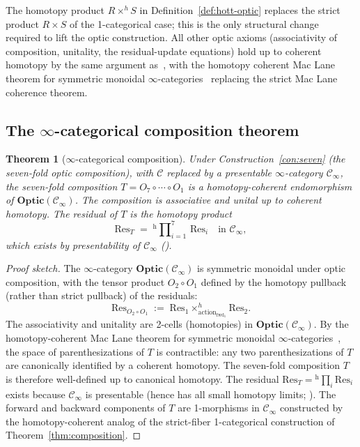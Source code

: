 \documentclass[11pt,a4paper]{article}
\theoremstyle{plain}
\newtheorem{theorem}{Theorem}[section]
\theoremstyle{definition}
\theoremstyle{remark}
\newcommand{\Optic}{\mathbf{Optic}}
\begin{document}
The homotopy product $R \times^h S$ in
Definition~\ref{def:hott-optic} replaces the strict product $R \times S$
of the 1-categorical case; this is the only structural change required
to lift the optic construction. All other optic axioms (associativity of
composition, unitality, the residual-update equations) hold up to
coherent homotopy by the same argument as~\cite[Proposition~2.3]
{riley2018optics}, with the homotopy coherent Mac Lane theorem for
symmetric monoidal $\infty$-categories~\cite[Theorem~2.4.3]
{lurie2017ha} replacing the strict Mac Lane coherence theorem.

\subsection{The $\infty$-categorical composition theorem}

\begin{theorem}[$\infty$-categorical composition]
\label{thm:hott-composition}
Under Construction~\ref{con:seven} (the seven-fold optic composition),
with $\mathcal{C}$ replaced by a presentable $\infty$-category
$\mathcal{C}_\infty$, the seven-fold composition $T = O_7 \circ \cdots
\circ O_1$ is a homotopy-coherent endomorphism of
$\Optic(\mathcal{C}_\infty)$. The composition is associative and
unital up to coherent homotopy. The residual of $T$ is the homotopy
product
\[
\mathrm{Res}_T \;=\; {}^{\mathrm{h}}\!\prod\nolimits_{i=1}^{7}\,\mathrm{Res}_i
\quad \text{in } \mathcal{C}_\infty,
\]
which exists by presentability of $\mathcal{C}_\infty$
(\cite[Proposition~5.5.3.1]{lurie2009htt}).
\end{theorem}

\begin{proof}[Proof sketch]
The $\infty$-category $\Optic(\mathcal{C}_\infty)$ is symmetric
monoidal under optic composition, with the tensor product $O_2 \circ
O_1$ defined by the homotopy pullback (rather than strict pullback) of
the residuals:
\[
\mathrm{Res}_{O_2 \circ O_1} \;:=\;
\mathrm{Res}_1 \times^h_{\mathrm{action}_{\mathrm{fwd}_1}} \mathrm{Res}_2.
\]
The associativity and unitality are 2-cells (homotopies) in
$\Optic(\mathcal{C}_\infty)$. By the homotopy-coherent Mac Lane theorem
for symmetric monoidal $\infty$-categories~\cite[Theorem~2.4.3]
{lurie2017ha}, the space of parenthesizations of $T$ is contractible:
any two parenthesizations of $T$ are canonically identified by a
coherent homotopy. The seven-fold composition $T$ is therefore
well-defined up to canonical homotopy. The residual
$\mathrm{Res}_T = {}^{\mathrm{h}}\!\prod_i \mathrm{Res}_i$ exists because
$\mathcal{C}_\infty$ is presentable (hence has all small homotopy
limits; \cite[Proposition~5.5.3.1]{lurie2009htt}). The forward and
backward components of $T$ are 1-morphisms in $\mathcal{C}_\infty$
constructed by the homotopy-coherent analog of the strict-fiber
1-categorical construction of Theorem~\ref{thm:composition}.
\end{proof}
\end{document}
